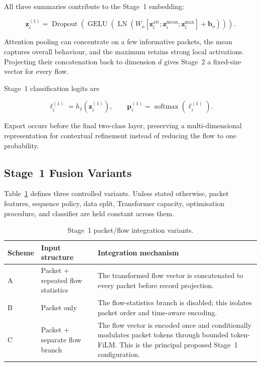 \documentclass[11pt,fleqn]{report}
\begin{document}
All three summaries contribute to the Stage~1 embedding:

\begin{equation}
    \mathbf{z}^{(1)}_i
    =\operatorname{Dropout}
      \left(
        \operatorname{GELU}
        \left(
          \operatorname{LN}
          \left(
            W_o
            [\mathbf{z}^{\mathrm{att}}_i;
             \mathbf{z}^{\mathrm{mean}}_i;
             \mathbf{z}^{\mathrm{max}}_i]
            +\mathbf{b}_o
          \right)
        \right)
      \right).
    \label{eq:hybrid_pooling}
\end{equation}

Attention pooling can concentrate on a few informative packets, the mean captures overall behaviour, and the maximum retains strong local activations. Projecting their concatenation back to dimension $d$ gives Stage~2 a fixed-size vector for every flow.

Stage~1 classification logits are

\begin{equation}
    \boldsymbol{\ell}^{(1)}_i
    =h_1(\mathbf{z}^{(1)}_i),
    \qquad
    \mathbf{p}^{(1)}_i
    =\operatorname{softmax}(\boldsymbol{\ell}^{(1)}_i).
    \label{eq:stage1_classifier}
\end{equation}

Export occurs before the final two-class layer, preserving a multi-dimensional representation for contextual refinement instead of reducing the flow to one probability.

\subsection{Stage~1 Fusion Variants}
\label{subsubsec:stage1_variants}

Table~\ref{tab:stage1_fusion_variants} defines three controlled variants. Unless stated otherwise, packet features, sequence policy, data split, Transformer capacity, optimisation procedure, and classifier are held constant across them.

\begin{table}[H]
    \centering
    \caption{Stage~1 packet/flow integration variants.}
    \label{tab:stage1_fusion_variants}
    \small
    \begin{tabular}{@{}p{1.1cm}p{3.1cm}p{8.9cm}@{}}
        \toprule
        Scheme & Input structure & Integration mechanism \\
        \midrule
        A & Packet + repeated flow statistics & The transformed flow vector is concatenated to every packet before record projection. \\
        B & Packet only & The flow-statistics branch is disabled; this isolates packet order and time-aware encoding. \\
        C & Packet + separate flow branch & The flow vector is encoded once and conditionally modulates packet tokens through bounded token-FiLM. This is the principal proposed Stage~1 configuration. \\
        \bottomrule
    \end{tabular}
\end{table}
\end{document}
